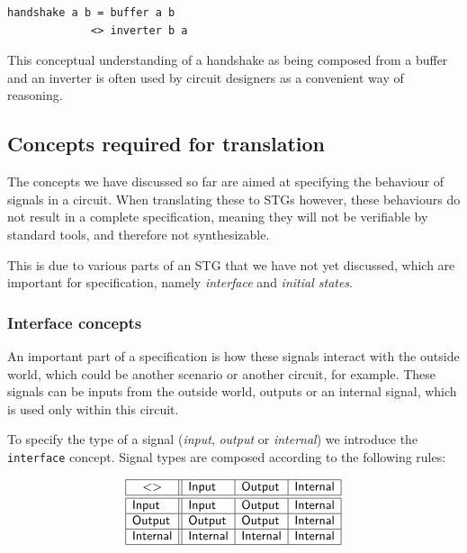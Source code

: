 \documentclass[british, 10pt, conference, compsocconf]{IEEEtran}
\begin{document}
\begin{verbatim}
handshake a b = buffer a b 
             <> inverter b a
\end{verbatim}

This conceptual understanding of a handshake as being composed
from a buffer and an inverter is often used by circuit designers as
a convenient way of reasoning.

\vspace{-1mm}

\subsection{Concepts required for translation\label{sub:trans-concepts}}

\vspace{-1mm}

The concepts we have discussed so far are aimed at specifying the behaviour of 
signals in a circuit. When translating these to STGs however, these behaviours 
do not result in a complete specification, meaning they will not be 
verifiable by standard tools, and therefore not synthesizable.

This is due to various parts of an STG that we have not yet discussed, which 
are important for specification, namely \emph{interface} and 
\emph{initial states}.


\subsubsection{Interface concepts\label{sub:interface}} 

An important part of a specification is how these signals interact with the 
outside world, which could be another scenario or another circuit, for example.
These signals can be inputs from the outside world, outputs or an internal 
signal, which is used only within this circuit. 

To specify the type of a signal (\emph{input},
\emph{output} or \emph{internal}) we introduce the \texttt{interface} concept.
Signal types are composed according to the following rules:

\vspace{-1mm}

\[
\begin{array}{|l||l|l|l|}
\hline
\multicolumn{1}{|c||}{<>} & \mathsf{Input} & \mathsf{Output} &
\mathsf{Internal} \\ \hline \hline
\mathsf{Input} & \mathsf{Input} & \mathsf{Output} & \mathsf{Internal} \\ \hline
\mathsf{Output} & \mathsf{Output} & \mathsf{Output} & \mathsf{Internal} \\
\hline
\mathsf{Internal}& \mathsf{Internal} & \mathsf{Internal} & \mathsf{Internal} \\
\hline
\end{array}
\]
\end{document}
